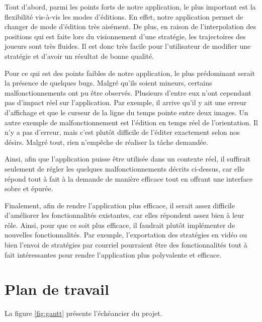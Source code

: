 \documentclass[ULlof]{ULrapport}
\begin{document}
Tout d'abord, parmi les points forts de notre application, le plus important est la flexibilité vis-à-vis les modes d'éditions. En effet, notre application permet de changer de mode d'édition très aisément. De plus, en raison de l'interpolation des positions qui est faite lors du visionnement d'une stratégie, les trajectoires des joueurs sont très fluides. Il est donc très facile pour l'utilisateur de modifier une stratégie et d'avoir un résultat de bonne qualité.

Pour ce qui est des points faibles de notre application, le plus prédominant serait la présence de quelques bugs. Malgré qu'ils soient mineurs, certains malfonctionnements ont pu être observés. Plusieurs d'entre eux n'ont cependant pas d'impact réel sur l'application. Par exemple, il arrive qu'il y ait une erreur d'affichage et que le curseur de la ligne du temps pointe entre deux images. Un autre exemple de malfonctionnement est l'édition en temps réel de l'orientation. Il n'y a pas d'erreur, mais c'est plutôt difficile de l'éditer exactement selon nos désirs. Malgré tout, rien n'empêche de réaliser la tâche demandée.

Ainsi, afin que l'application puisse être utilisée dans un contexte réel, il suffirait seulement de régler les quelques malfonctionnements décrits ci-dessus, car elle répond tout à fait à la demande de manière efficace tout en offrant une interface sobre et épurée.

Finalement, afin de rendre l'application plus efficace, il serait assez difficile d'améliorer les fonctionnalités existantes, car elles répondent assez bien à leur rôle. Ainsi, pour que ce soit plus efficace, il faudrait plutôt implémenter de nouvelles fonctionnalités. Par exemple, l'exportation des stratégies en vidéo ou bien l'envoi de stratégies par courriel pourraient être des fonctionnalités tout à fait intéressantes pour rendre l'application plus polyvalente et efficace.

\chapter{Plan de travail}

La figure \ref{fig:gantt} présente l'échéancier du projet.
\end{document}
